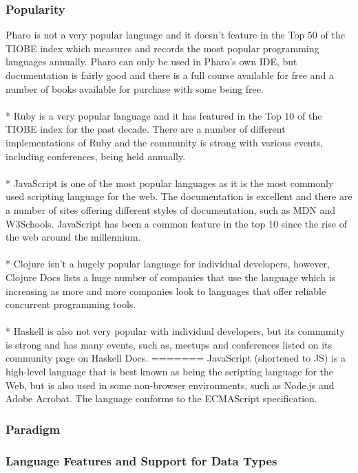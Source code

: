 \subsubsection*{Popularity}
Pharo is not a very popular language and it doesn't feature in the Top 50 of the TIOBE index which measures and records the most popular programming languages annually. Pharo can only be used in Pharo's own IDE, but documentation is fairly good and there is a full course available for free and a number of books available for purchase with some being free.\\\\*
Ruby is a very popular language and it has featured in the Top 10 of the TIOBE index for the past decade. There are a number of different implementations of Ruby and the community is strong with various events, including conferences, being held annually.\\\\*
JavaScript is one of the most popular languages as it is the most commonly used scripting language for the web. The documentation is excellent and there are a number of sites offering different styles of documentation, such as MDN and W3Schools. JavaScript has been a common feature in the top 10 since the rise of the web around the millennium.\\\\*
Clojure isn't a hugely popular language for individual developers, however, Clojure Docs lists a huge number of companies that use the language which is increasing as more and more companies look to languages that offer reliable concurrent programming tools.\\\\*
Haskell is also not very popular with individual developers, but its community is strong and has many events, such as, meetups and conferences listed on its community page on Haskell Docs.
=======
JavaScript (shortened to JS) is a high-level language that is best known as being the scripting language for the Web, but is also used in some non-browser environments, such as Node.js and Adobe Acrobat. The language conforms to the ECMAScript specification.
\subsubsection*{Paradigm}
\subsubsection*{Language Features and Support for Data Types}
